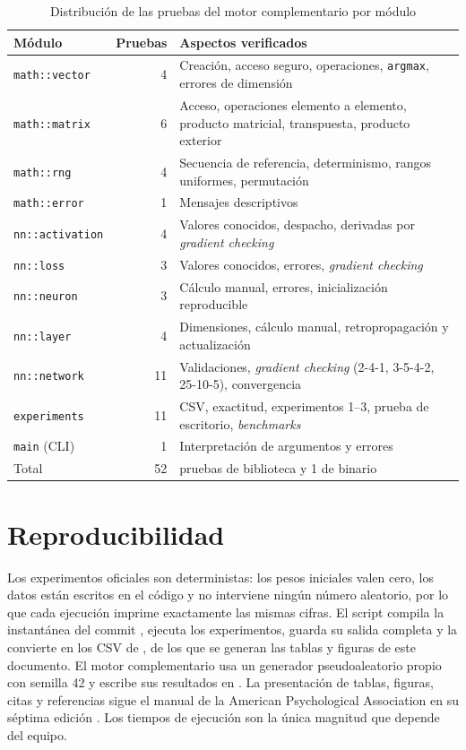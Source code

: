 \begin{table}[!htbp]
\caption{Distribución de las pruebas del motor complementario por módulo}\label{tab:pruebas}
\small
\begin{tabularx}{\textwidth}{@{}l r >{\raggedright\arraybackslash}X@{}}
\toprule
Módulo & Pruebas & Aspectos verificados \\
\midrule
\texttt{math::vector} & 4 & Creación, acceso seguro, operaciones, \texttt{argmax}, errores de dimensión \\
\texttt{math::matrix} & 6 & Acceso, operaciones elemento a elemento, producto matricial, transpuesta, producto exterior \\
\texttt{math::rng} & 4 & Secuencia de referencia, determinismo, rangos uniformes, permutación \\
\texttt{math::error} & 1 & Mensajes descriptivos \\
\texttt{nn::activation} & 4 & Valores conocidos, despacho, derivadas por \emph{gradient checking} \\
\texttt{nn::loss} & 3 & Valores conocidos, errores, \emph{gradient checking} \\
\texttt{nn::neuron} & 3 & Cálculo manual, errores, inicialización reproducible \\
\texttt{nn::layer} & 4 & Dimensiones, cálculo manual, retropropagación y actualización \\
\texttt{nn::network} & 11 & Validaciones, \emph{gradient checking} (2-4-1, 3-5-4-2, 25-10-5), convergencia \\
\texttt{experiments} & 11 & CSV, exactitud, experimentos 1--3, prueba de escritorio, \emph{benchmarks} \\
\texttt{main} (CLI) & 1 & Interpretación de argumentos y errores \\
\midrule
Total & 52 & 51 pruebas de biblioteca y 1 de binario \\
\bottomrule
\end{tabularx}
\end{table}

\section{Reproducibilidad}
Los experimentos oficiales son deterministas: los pesos iniciales valen cero, los datos están escritos en el código y no interviene ningún número aleatorio, por lo que cada ejecución imprime exactamente las mismas cifras. El script  compila la instantánea del commit \texttt{\OfCommit}, ejecuta los experimentos, guarda su salida completa y la convierte en los CSV de , de los que se generan las tablas y figuras de este documento. El motor complementario usa un generador pseudoaleatorio propio con semilla 42 y escribe sus resultados en . La presentación de tablas, figuras, citas y referencias sigue el manual de la American Psychological Association en su séptima edición \citep{apa2020}. Los tiempos de ejecución son la única magnitud que depende del equipo.


